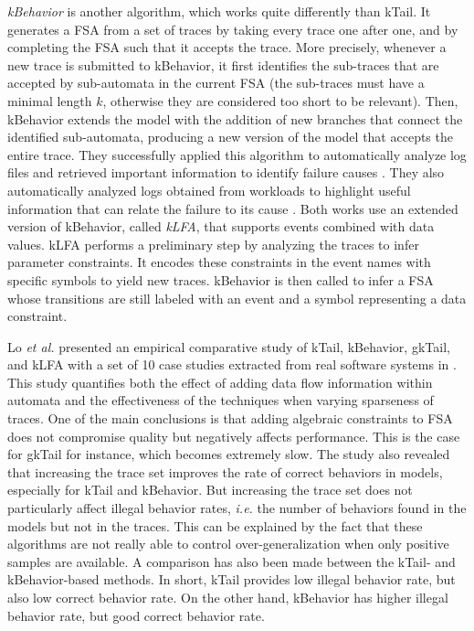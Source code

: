 \textit{kBehavior} \cite{mariani2007dynamic} is another
algorithm, which works quite differently than kTail. It generates
a FSA from a set of traces by taking every trace one after one,
and by completing the FSA such that it accepts the trace. More
precisely, whenever a new trace is submitted to kBehavior, it
first identifies the sub-traces that are accepted by sub-automata
in the current FSA (the sub-traces must have a minimal length
$k$, otherwise they are considered too short to be relevant).
Then, kBehavior extends the model with the addition of new
branches that connect the identified sub-automata,
producing a new version of the model that accepts the entire
trace. They successfully applied this algorithm to automatically
analyze log files and retrieved important information to identify
failure causes \cite{4700316}. They also automatically analyzed
logs obtained from workloads to highlight useful information that
can relate the failure to its cause
\cite{cotroneo2007investigation}. Both works
\cite{4700316,cotroneo2007investigation} use an extended version
of kBehavior, called \textit{kLFA}, that supports events
combined with data values. kLFA performs a preliminary step by
analyzing the traces to infer parameter constraints. It encodes
these constraints in the event names with specific symbols to
yield new traces. kBehavior is then called to infer a FSA whose
transitions are still labeled with an event and a symbol
representing a data constraint.

Lo \emph{et al.} presented an empirical comparative study of kTail,
kBehavior, gkTail, and kLFA with a set of 10 case studies
extracted from real software systems in \cite{Lo20122063}. This
study quantifies both the effect of adding data flow information
within automata and the effectiveness of the techniques when
varying sparseness of traces. One of the main conclusions is that
adding algebraic constraints to FSA does not compromise quality
but negatively affects performance. This is the case for gkTail
for instance, which becomes extremely slow. The study also
revealed that increasing the trace set improves the rate of
correct behaviors in models, especially for kTail and kBehavior.
But increasing the trace set does not particularly affect illegal
behavior rates, \emph{i.e.} the number of behaviors found in the models
but not in the traces. This can be explained by the fact that
these algorithms are not really able to control
over-generalization when only positive samples are available. A
comparison has also been made between the kTail- and
kBehavior-based methods. In short, kTail provides low illegal
behavior rate, but also low correct behavior rate. On the other
hand, kBehavior has higher illegal behavior rate, but good
correct behavior rate.

